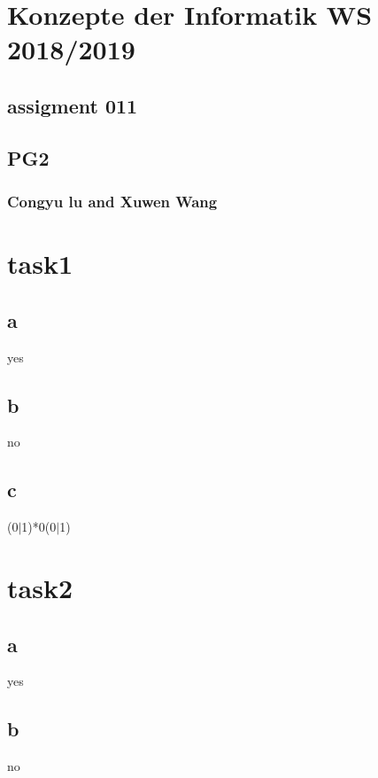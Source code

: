 \documentclass[10pt,a4paper]{article} \usepackage{listings} \usepackage[utf8]{inputenc} \usepackage[german]{babel} \usepackage{amsmath,amsfonts,amssymb,bbm} \usepackage[left=2cm,right=2cm,top=2cm,bottom=2cm]{geometry} \usepackage{minibox} \usepackage{graphicx,xcolor} \usepackage{subfigure} \usepackage{enumitem} \usepackage[hidelinks]{hyperref} \usepackage{xspace}
\title{}
\author{}
\begin{document}
\maketitle
\section{Konzepte der Informatik WS 2018/2019}
\subsection{assigment 011} %
\subsection{PG2} %
\subsubsection{Congyu lu and Xuwen Wang} %

\section{task1}
\subsection{a}
yes\\
\subsection{b}
no\\
\subsection{c}
(0$|$1)*0(0$|$1)\\

\section{task2}
\subsection{a}
yes\\
\subsection{b}
no\\
\end{document}
